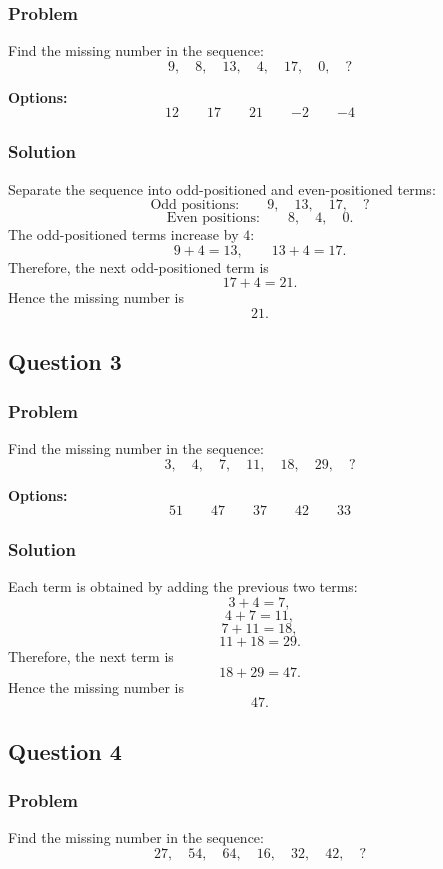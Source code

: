 \documentclass[12pt]{article}
\begin{document}
\subsubsection{Problem}
Find the missing number in the sequence:
\[
9,\quad 8,\quad 13,\quad 4,\quad 17,\quad 0,\quad ?
\]

\noindent\textbf{Options:}
\[
\boxed{12}
\qquad
\boxed{17}
\qquad
\boxed{21}
\qquad
\boxed{-2}
\qquad
\boxed{-4}
\]

\subsubsection{Solution}
Separate the sequence into odd-positioned and even-positioned terms:
\[
\text{Odd positions:}\qquad 9,\quad 13,\quad 17,\quad ?
\]
\[
\text{Even positions:}\qquad 8,\quad 4,\quad 0.
\]
The odd-positioned terms increase by \(4\):
\[
9+4=13,\qquad 13+4=17.
\]
Therefore, the next odd-positioned term is
\[
17+4=21.
\]
Hence the missing number is
\[
\boxed{21}.
\]

\subsection{Question 3}
\subsubsection{Problem}
Find the missing number in the sequence:
\[
3,\quad 4,\quad 7,\quad 11,\quad 18,\quad 29,\quad ?
\]

\noindent\textbf{Options:}
\[
\boxed{51}
\qquad
\boxed{47}
\qquad
\boxed{37}
\qquad
\boxed{42}
\qquad
\boxed{33}
\]

\subsubsection{Solution}
Each term is obtained by adding the previous two terms:
\[
3+4=7,
\]
\[
4+7=11,
\]
\[
7+11=18,
\]
\[
11+18=29.
\]
Therefore, the next term is
\[
18+29=47.
\]
Hence the missing number is
\[
\boxed{47}.
\]

\subsection{Question 4}
\subsubsection{Problem}
Find the missing number in the sequence:
\[
27,\quad 54,\quad 64,\quad 16,\quad 32,\quad 42,\quad ?
\]
\end{document}
